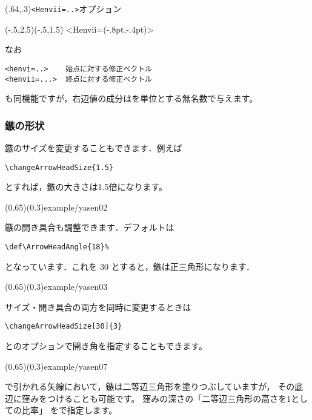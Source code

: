 \begin{showEx}(.64,.3){\texttt{<Henvii=..>}オプション}
\begin{zahyou*}[ul=10mm](-.5,2.5)(-.5,1.5)
  \Kuromaru\B
  \ArrowLine<Henvii={(-.8pt,-.4pt)}>\A\B
\end{zahyou*}
\end{showEx}

なお
\begin{jquote}
\begin{verbatim}
<henvi=..>    始点に対する修正ベクトル
<henvii=...>  終点に対する修正ベクトル
\end{verbatim}
\end{jquote}
も同機能ですが，右辺値の成分はを単位とする無名数で与えます。

\subsubsection{鏃の形状}
鏃のサイズを変更することもできます．例えば
\begin{jquote}
\begin{verbatim}
\changeArrowHeadSize{1.5}
\end{verbatim}
\end{jquote}
とすれば，鏃の大きさは1.5倍になります。

{(0.65)(0.3){example/yasen02}}

鏃の開き具合も調整できます．デフォルトは
\begin{jquote}
\begin{verbatim}
\def\ArrowHeadAngle{18}%
\end{verbatim}
\end{jquote}
となっています．これを 30 とすると，鏃は正三角形になります．

{(0.65)(0.3){example/yasen03}}

サイズ・開き具合の両方を同時に変更するときは
\begin{jquote}
\begin{verbatim}
\changeArrowHeadSize[30]{3}
\end{verbatim}
\end{jquote}

とのオプションで開き角を指定することもできます。

(0.65)(0.3){example/yasen07}

で引かれる矢線において，鏃は二等辺三角形を塗りつぶしていますが，
その底辺に窪みをつけることも可能です。
窪みの深さの「二等辺三角形の高さを1としての比率」
をで指定します。

